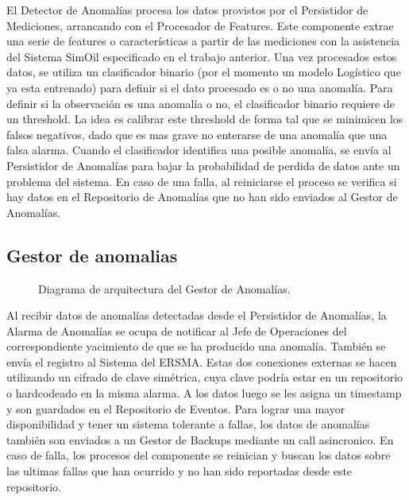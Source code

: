 \documentclass{article}
\theoremstyle{definition}
\theoremstyle{remark}
\begin{document}
El Detector de Anomalías procesa los datos provistos por el Persistidor de Mediciones, arrancando con el Procesador de Features. Este componente extrae una serie de features o características a partir de las mediciones con la asistencia del Sistema SimOil especificado en el trabajo anterior. Una vez procesados estos datos, se utiliza un clasificador binario (por el momento un modelo Logístico que ya esta entrenado) para definir si el dato procesado es o no una anomalía. Para definir si la observación es una anomalía o no, el clasificador binario requiere de un threshold. La idea es calibrar este threshold de forma tal que se minimicen los falsos negativos, dado que es mas grave no enterarse de una anomalía que una falsa alarma. Cuando el clasificador identifica una posible anomalía, se envía al Persistidor de Anomalías para bajar la probabilidad de perdida de datos ante un problema del sistema. En caso de una falla, al reiniciarse el proceso se verifica si hay datos en el Repositorio de Anomalías que no han sido enviados al Gestor de Anomalías.

\subsection{Gestor de anomalias} \label{gestor_anomalias}

\begin{figure}[H]
  \caption{Diagrama de arquitectura del Gestor de Anomalías.}
\end{figure}

Al recibir datos de anomalías detectadas desde el Persistidor de Anomalías, la Alarma de Anomalías se ocupa de notificar al Jefe de Operaciones del correspondiente yacimiento de que se ha producido una anomalía. También se envía el registro al Sistema del ERSMA. Estas dos conexiones externas se hacen utilizando un cifrado de clave simétrica, cuya clave podría estar en un repositorio o hardcodeado en la misma alarma. A los datos luego se les asigna un timestamp y son guardados en el Repositorio de Eventos. Para lograr una mayor disponibilidad y tener un sistema tolerante a fallas, los datos de anomalías también son enviados a un Gestor de Backups mediante un call asincronico. En caso de falla, los procesos del componente se reinician y buscan los datos sobre las ultimas fallas que han ocurrido y no han sido reportadas desde este repositorio.
\end{document}
